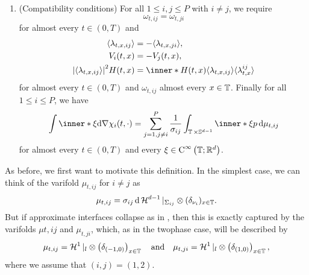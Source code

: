 \begin{definition}
\begin{enumerate}
	\item (Compatibility conditions)
	For all $ 1 \leq i , j \leq P $ with $ i \neq j $, we require 
	\begin{equation}
		\label{varifold_symmetry_of_energy_measures}
		\omega_{ t , i j }
		=
		\omega_{ t , j i } 
	\end{equation}
	for almost every $ t \in ( 0 , T ) $ and
	\begin{align}
		\label{varifold_symmetry_expectations}
		\langle \lambda_{ t, x , i j } \rangle
		&= 
		- \langle \lambda_{ t, x  ,j i } \rangle,
		\\
		\label{varifold_symmetry_velocities}
		V_{ i } ( t, x ) 
		&= 
		- V_{ j } ( t, x ),
		\\
		\label{varifold_mean_curvature_points_in_normal_direction}
		\abs{ \langle \lambda_{ t , x , i j } \rangle }^{ 2 }
		H ( t, x )
		& =
		\inner*{ H( t , x ) }{ \langle \lambda_{ t , x , i j } \rangle }
		\langle \lambda_{ t , x }^{ i j } \rangle
	\end{align}
	for almost every $ t \in ( 0 , T ) $ and $ \omega_{ t , i j } $ 
	almost every $ x \in \operatorname{\mathbb{T}} $. Finally for all $ 1 \leq i \leq P $, we 
	have
	\begin{equation}
		\label{varifold_compatibility_condition_multiphase}
		\int
			\inner*{ \xi }{ \dd{ \nabla \chi_{ i } ( t , \cdot ) } }
		=
		\sum_{ j = 1 , j \neq i }^{ P }
			\frac{ 1 }{ \sigma_{ i j } }
			\int_{ \flattorus \times \mathbb{ S }^{ d - 1 } }
				\inner*{ \xi }{ p }
			\dd{ \mu_{ t , i j } }
	\end{equation}
	for almost every $ t \in ( 0 , T ) $ and every $ \xi \in \operatorname{C}^{ 
	\infty } \left( \operatorname{\mathbb{T}} ; \mathbb{ R }^{ d } \right) $.
	\end{enumerate}
\end{definition}

As before, we first want to motivate this definition. In the simplest case, we 
can think of the varifold $ \mu_{ t , i j } $ for $ i \neq j $ as
\begin{equation}
	\label{varifold_simplest_case_mutliphase}
	\mu_{ t , i j }
	=
	\sigma_{ i j }
	\dd{ \operatorname{\mathcal{H}}^{ d - 1 }|_{ \Sigma_{ i j } } } 
	\otimes
	( \delta_{ \nu_{ i } } )_{ x \in \operatorname{\mathbb{T}} }.
\end{equation}
But if approximate interfaces collapse as in 
, then this is exactly captured by the 
varifolds $ \mu{ t, i j }$ and $ \mu_{ t , j i } $, which, as in the 
twophase case, will be 
described by
\begin{equation}
	\label{varifold_when_interfaces_collapse}
	\mu_{ t, i j }
	=
	\operatorname{\mathcal{H}}^{ 1 } |_{ l }
	\otimes
	\left( \delta_{ ( -1 , 0 ) } \right)_{ x \in \operatorname{\mathbb{T}} }
	\quad \text{and} \quad
	\mu_{ t , j i }
	=
	\operatorname{\mathcal{H}}^{ 1 } |_{ l }
	\otimes
	\left( \delta_{ ( 1 , 0 ) } \right)_{ x \in \operatorname{\mathbb{T}} },
\end{equation}
where we assume that $ ( i , j ) = ( 1 , 2 ) $.

